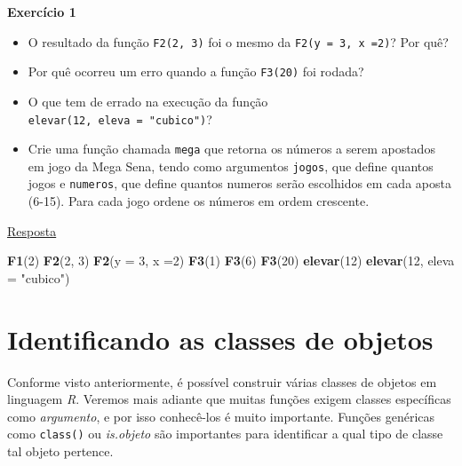 \documentclass[
]{book}
\newenvironment{Shaded}{\begin{snugshade}}{\end{snugshade}}
\newcommand{\DataTypeTok}[1]{\textcolor[rgb]{0.13,0.29,0.53}{#1}}
\newcommand{\DecValTok}[1]{\textcolor[rgb]{0.00,0.00,0.81}{#1}}
\newcommand{\KeywordTok}[1]{\textcolor[rgb]{0.13,0.29,0.53}{\textbf{#1}}}
\newcommand{\NormalTok}[1]{#1}
\newcommand{\StringTok}[1]{\textcolor[rgb]{0.31,0.60,0.02}{#1}}
\providecommand{\tightlist}{%
  \setlength{\itemsep}{0pt}\setlength{\parskip}{0pt}}
\begin{document}
\begin{tarefa}
\textbf{Exercício 1}

\begin{itemize}
\tightlist
\item
  O resultado da função \texttt{F2(2,\ 3)} foi o mesmo da \texttt{F2(y\ =\ 3,\ x\ =2)}? Por quê?
\item
  Por quê ocorreu um erro quando a função \texttt{F3(20)} foi rodada?
\item
  O que tem de errado na execução da função \texttt{elevar(12,\ eleva\ =\ "cubico")}?
\item
  Crie uma função chamada \texttt{mega} que retorna os números a serem apostados em jogo da Mega Sena, tendo como argumentos \texttt{jogos}, que define quantos jogos e \texttt{numeros}, que define quantos numeros serão escolhidos em cada aposta (6-15). Para cada jogo ordene os números em ordem crescente.
\end{itemize}
\end{tarefa}

\protect\hyperlink{exerc1}{Resposta}

\begin{Shaded}
\begin{Highlighting}[]
\KeywordTok{F1}\NormalTok{(}\DecValTok{2}\NormalTok{)}
\KeywordTok{F2}\NormalTok{(}\DecValTok{2}\NormalTok{, }\DecValTok{3}\NormalTok{)}
\KeywordTok{F2}\NormalTok{(}\DataTypeTok{y =} \DecValTok{3}\NormalTok{, }\DataTypeTok{x =}\DecValTok{2}\NormalTok{)}
\KeywordTok{F3}\NormalTok{(}\DecValTok{1}\NormalTok{)}
\KeywordTok{F3}\NormalTok{(}\DecValTok{6}\NormalTok{)}
\KeywordTok{F3}\NormalTok{(}\DecValTok{20}\NormalTok{)}
\KeywordTok{elevar}\NormalTok{(}\DecValTok{12}\NormalTok{)}
\KeywordTok{elevar}\NormalTok{(}\DecValTok{12}\NormalTok{, }\DataTypeTok{eleva =} \StringTok{"cubico"}\NormalTok{)}
\end{Highlighting}
\end{Shaded}

\hypertarget{identificando-as-classes-de-objetos}{%
\section{Identificando as classes de objetos}\label{identificando-as-classes-de-objetos}}

Conforme visto anteriormente, é possível construir várias classes de objetos em linguagem \emph{R}. Veremos mais adiante que muitas funções exigem classes específicas como \emph{argumento}, e por isso conhecê-los é muito importante. Funções genéricas como \texttt{class()}  ou \emph{is.objeto} são importantes para identificar a qual tipo de classe tal objeto pertence.
\end{document}
